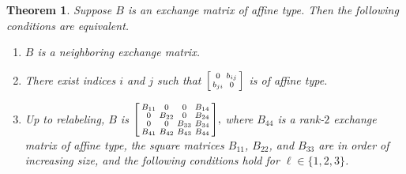 \documentclass{amsart}
\newtheorem{theorem}[proposition]{Theorem}
\theoremstyle{definition}
\theoremstyle{remark}
\numberwithin{equation}{section}
\newcommand{\set}[1]{{\lbrace #1 \rbrace}}
\newcommand{\0}{{\mathbf{0}}}
\renewcommand{\b}{\mathbf{b}}
\begin{document}
\begin{theorem}\label{neigh B}
Suppose $B$ is an exchange matrix of affine type.
Then the following conditions are equivalent.
\begin{enumerate}[label=\rm(\roman*), ref=(\roman*)]
\item \label{neigh}
$B$ is a neighboring exchange matrix.
\item \label{aff 2}
There exist indices $i$ and $j$ such that $\begin{bsmallmatrix}0&b_{ij}\\b_{ji}&0\end{bsmallmatrix}$ is of affine type.
\item \label{neigh detailed}
Up to relabeling, $B$ is
    $
      \begin{bsmallmatrix}
        B_{11} 	& 0 		& 0 		& B_{14} \\ 
        0 		& B_{22} 	& 0 		& B_{24} \\
        0 		& 0 		& B_{33} 	& B_{34} \\
        B_{41} 	& B_{42} 	& B_{43} 	& B_{44}
      \end{bsmallmatrix},
    $ 
where $B_{44}$ is a rank-$2$ exchange matrix of affine type, the square matrices $B_{11}$, $B_{22}$, and $B_{33}$ are in order of increasing size, and the following conditions hold for ${\ell\in\set{1,2,3}}$.
\end{enumerate}
\end{theorem}
\end{document}
